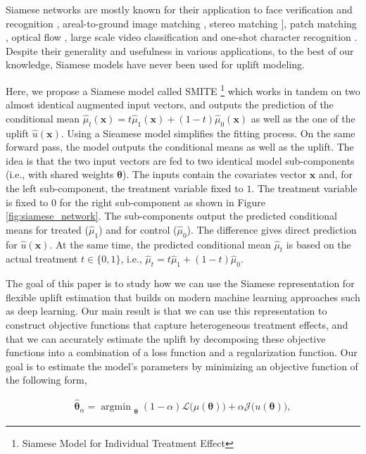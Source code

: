 \documentclass{article}
\def\x{\mathbf x}
\DeclareMathOperator*{\argmin}{argmin~} %
\begin{document}
Siamese networks are mostly known for their application to face verification and recognition \citep{chopra2005learning,taigman2014deepface,parkhi2015deep,schroff2015facenet}, areal-to-ground image matching \citep{lin2015learning}, stereo matching \citep{zbontar2015computing}], patch matching \citep{han2015matchnet, simo2015discriminative,zagoruyko2015learning}, optical flow \citep{dosovitskiy2015flownet}, large scale video classification \citep{karpathy2014large} and one-shot character recognition \citep{koch2015siamese}. Despite their generality and usefulness in various applications, to the best of our knowledge, Siamese models have never been used for uplift modeling.

Here, we propose a Siamese model called SMITE \footnote{Siamese Model for Individual Treatment Effect} which works in tandem on two almost identical augmented input vectors, and outputs the prediction of the conditional mean $\hat{\mu}_t(\x) = t \hat{\mu}_1(\x) + (1-t) \hat{\mu}_0(\x)$ as well as the one of the uplift $\hat{u}(\x)$. Using a Sieamese model simplifies the fitting process. On the same forward pass, the model outputs the conditional means as well as the uplift. The idea is that the two input vectors are fed to two identical model sub-components (i.e., with shared weights $\boldsymbol{\theta}$). The inputs contain the covariates vector $\x$ and, for the left sub-component, the treatment variable fixed to $1$. The treatment variable is fixed to $0$ for the right sub-component as shown in Figure \ref{fig:siamese_network}. The sub-components output the predicted conditional means for treated ($\hat{\mu}_1$) and for control ($\hat{\mu}_0$). The difference gives direct prediction for $\hat{u}(\x)$. At the same time, the predicted conditional mean $\hat{\mu}_t$ is based on the actual treatment $t \in \{0,1\}$, i.e., $\hat{\mu}_t = t\hat{\mu}_1 + (1-t)\hat{\mu}_0$. 


The goal of this paper is to study how we can use the Siamese representation
for flexible uplift estimation that builds on modern machine learning approaches
such as deep learning. Our main result is that we can use this representation
to construct objective functions that capture heterogeneous treatment effects, and that we can accurately estimate the uplift by decomposing these objective functions into a combination of a loss function and a regularization function. Our goal is to estimate the model's parameters by minimizing an objective function of the following form, 


\begin{align}
    {\boldsymbol{\hat\theta}}_{\alpha} = \argmin_{\boldsymbol{\theta}} (1 - \alpha)  \mathcal{L}\Big(\mu(\boldsymbol{\theta})\Big) + \alpha \mathcal{J}\Big(u(\boldsymbol{\theta})\Big),
    \label{eq:SMITE_general_objective}
\end{align}
\end{document}
